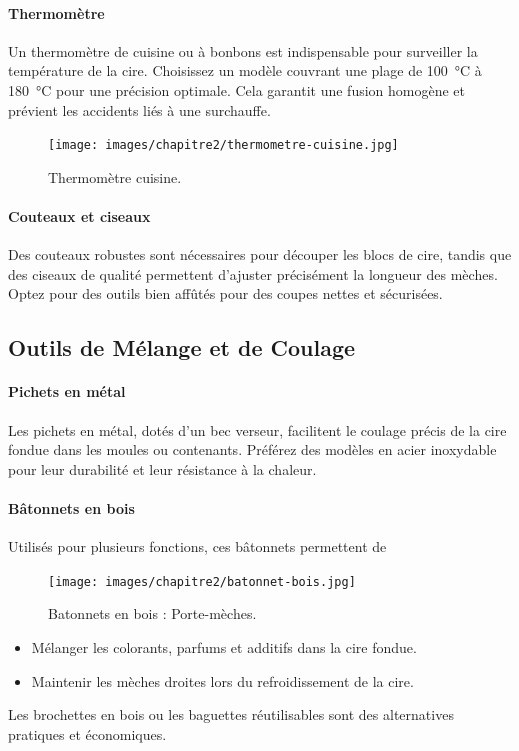 \documentclass[11pt,fleqn,onecolumn,oneside]{book}
\begin{document}
\paragraph{Thermomètre}
Un thermomètre de cuisine ou à bonbons est indispensable pour surveiller la température de la cire. Choisissez un modèle couvrant une plage de \SI{100}{\degreeCelsius} à \SI{180}{\degreeCelsius} pour une précision optimale. Cela garantit une fusion homogène et prévient les accidents liés à une surchauffe.

\begin{figure}[htbp]
    \centering
    \texttt{[image: images/chapitre2/thermometre-cuisine.jpg]}
    \caption{Thermomètre cuisine.}
    \label{fig:process_coloration}
\end{figure}

\paragraph{Couteaux et ciseaux}
Des couteaux robustes sont nécessaires pour découper les blocs de cire, tandis que des ciseaux de qualité permettent d’ajuster précisément la longueur des mèches. Optez pour des outils bien affûtés pour des coupes nettes et sécurisées.

\subsection*{Outils de Mélange et de Coulage}

\paragraph{Pichets en métal}
Les pichets en métal, dotés d’un bec verseur, facilitent le coulage précis de la cire fondue dans les moules ou contenants. Préférez des modèles en acier inoxydable pour leur durabilité et leur résistance à la chaleur.

\paragraph{Bâtonnets en bois}
Utilisés pour plusieurs fonctions, ces bâtonnets permettent de
\begin{figure}[htbp]
    \centering
    \texttt{[image: images/chapitre2/batonnet-bois.jpg]}
    \caption{Batonnets en bois : Porte-mèches.}
    \label{fig:process_coloration}
\end{figure}


\begin{itemize}
    \item Mélanger les colorants, parfums et additifs dans la cire fondue.
    \item Maintenir les mèches droites lors du refroidissement de la cire.
\end{itemize}
Les brochettes en bois ou les baguettes réutilisables sont des alternatives pratiques et économiques.
\end{document}
